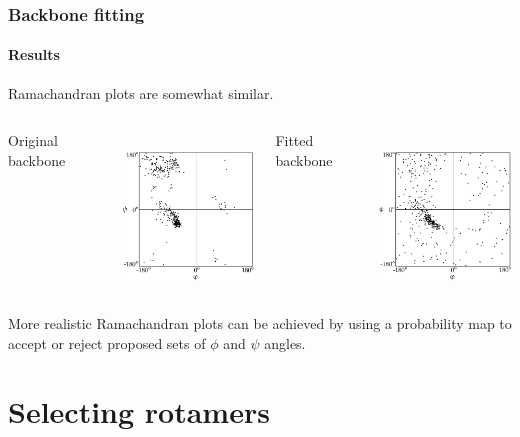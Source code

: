 \documentclass{beamer}
\begin{document}
\begin{frame}[t, fragile]
\frametitle{Backbone fitting} 
\framesubtitle{Results}

Ramachandran plots are somewhat similar.

\vspace*{2mm}
\begin{columns}[c]
\column{1.7in}
\centering
\begin{small}Original backbone\end{small}
\\
\hspace*{-.33cm}\includegraphics[width=1.7in]{plot_ramachandran_orig}

\column{1.7in}
\centering
\begin{small}Fitted backbone\end{small}
\\
\hspace*{-.4cm}\includegraphics[width=1.7in]{plot_ramachandran}
\end{columns}
\vspace*{2mm}

More realistic Ramachandran plots can be achieved by using a probability map to accept or reject proposed sets of $\phi$ and $\psi$ angles.

\end{frame}




\section{Selecting rotamers}
\end{document}
